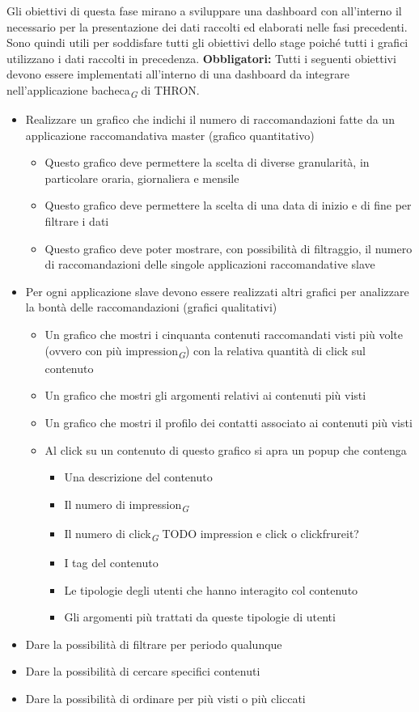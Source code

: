 \documentclass[a4paper, 12pt, twoside, openright]{book}
\newcommand{\gloss}[1]{#1\textsubscript{\textit{\tiny{G}}}}
\begin{document}
Gli obiettivi di questa fase mirano a sviluppare una dashboard con all'interno il necessario per la presentazione dei dati raccolti ed elaborati nelle fasi precedenti.\\ Sono quindi utili per soddisfare tutti gli obiettivi dello stage poiché tutti i grafici utilizzano i dati raccolti in precedenza.
\textbf{Obbligatori:}
Tutti i seguenti obiettivi devono essere implementati all'interno di una dashboard da integrare nell'applicazione \gloss{bacheca} di THRON.
\begin{itemize}
	\item Realizzare un grafico che indichi il numero di raccomandazioni fatte da un applicazione raccomandativa master (grafico quantitativo)
	\begin{itemize}
		\item Questo grafico deve permettere la scelta di diverse granularità, in particolare oraria, giornaliera e mensile
		\item Questo grafico deve permettere la scelta di una data di inizio e di fine per filtrare i dati
		\item Questo grafico deve poter mostrare, con possibilità di filtraggio, il numero di raccomandazioni delle singole applicazioni raccomandative slave
	\end{itemize}
	
	\item Per ogni applicazione slave devono essere realizzati altri grafici per analizzare la bontà delle raccomandazioni (grafici qualitativi)
	\begin{itemize}
		\item Un grafico che mostri i cinquanta contenuti raccomandati visti più volte (ovvero con più \gloss{impression}) con la relativa quantità di click sul contenuto 
		\item Un grafico che mostri gli argomenti relativi ai contenuti più visti
		\item Un grafico che mostri il profilo dei contatti associato ai contenuti più visti
		
		\item Al click su un contenuto di questo grafico si apra un popup che contenga 
		\begin{itemize}
			\item Una descrizione del contenuto
			\item Il numero di \gloss{impression}
			\item Il numero di \gloss{click} TODO impression e click o clickfrureit?
			\item I tag del contenuto
			\item Le tipologie degli utenti che hanno interagito col contenuto
			\item Gli argomenti più trattati da queste tipologie di utenti
		\end{itemize} 
	\end{itemize}

	\item Dare la possibilità di filtrare per periodo qualunque
	\item Dare la possibilità di cercare specifici contenuti
	\item Dare la possibilità di ordinare per più visti o più cliccati
\end{itemize}
\end{document}
